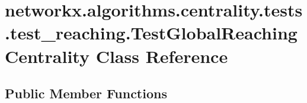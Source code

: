 \hypertarget{classnetworkx_1_1algorithms_1_1centrality_1_1tests_1_1test__reaching_1_1TestGlobalReachingCentrality}{}\section{networkx.\+algorithms.\+centrality.\+tests.\+test\+\_\+reaching.\+Test\+Global\+Reaching\+Centrality Class Reference}
\label{classnetworkx_1_1algorithms_1_1centrality_1_1tests_1_1test__reaching_1_1TestGlobalReachingCentrality}
\subsection*{Public Member Functions}
